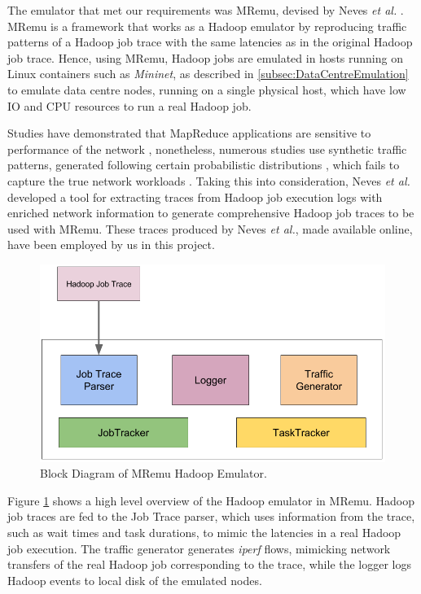 The emulator that met our requirements was MRemu, devised by Neves \textit{et al.} \cite{neves2015mremu}. MRemu is a framework that works as a Hadoop emulator by reproducing traffic patterns of a Hadoop job trace with the same latencies as in the original Hadoop job trace. Hence, using MRemu, Hadoop jobs are emulated in hosts running on Linux containers \cite{neves2015mremu} such as \textit{Mininet}, as described in \ref{subsec:DataCentreEmulation} to emulate data centre nodes, running on a single physical host, which have low IO and CPU resources to run a real Hadoop job.

Studies have demonstrated that MapReduce applications are sensitive to performance of the network \cite{das2013transparent, chowdhury2011managing}, nonetheless, numerous studies use synthetic traffic patterns, generated following certain probabilistic distributions \cite{al2008scalable, greenberg2009vl2, curtis2011devoflow}, which fails to capture the true network workloads \cite{neves2015mremu}. Taking this into consideration, Neves \textit{et al.} developed a tool for extracting traces from Hadoop job execution logs with enriched network information to generate comprehensive Hadoop job traces to be used with MRemu. These traces \cite{MRemuRepo2015} produced by Neves \textit{et al.}, made available online, have been employed by us in this project. 

\begin{figure}[!ht] 
\centerline{\includegraphics[scale=0.30]{MRemuOverview.png}}
\caption{Block Diagram of MRemu Hadoop Emulator.}
\label{fig:MRemuOverview}
\end{figure}

Figure \ref{fig:MRemuOverview} shows a high level overview of the Hadoop emulator in MRemu. Hadoop job traces are fed to the Job Trace parser, which uses information from the trace, such as wait times and task durations, to mimic the latencies in a real Hadoop job execution. The traffic generator generates \textit{iperf} flows, mimicking network transfers of the real Hadoop job corresponding to the trace, while the logger logs Hadoop events to local disk of the emulated nodes.  


